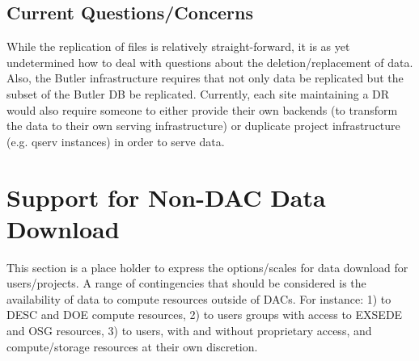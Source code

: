 \subsection{Current Questions/Concerns}
While the replication of files is relatively straight-forward, it is as yet undetermined how to deal
with questions about the deletion/replacement of data.  Also, the Butler infrastructure requires that 
not only data be replicated but the subset of the Butler DB be replicated.  Currently, each site 
maintaining a DR would also require someone to either provide their own backends (to transform the data 
to their own serving infrastructure) or duplicate project infrastructure (e.g. qserv instances) in order
to serve data.


\section{Support for Non-DAC Data Download\label{sec_users}}

This section is a place holder to express the options/scales for data download for users/projects.
A range of contingencies that should be considered is the availability of data to compute resources outside of DACs.
For instance: 1) to DESC and DOE compute resources, 2) to users groups with access to EXSEDE and OSG 
resources, 3) to users, with and without proprietary access, and compute/storage resources at their own discretion.






